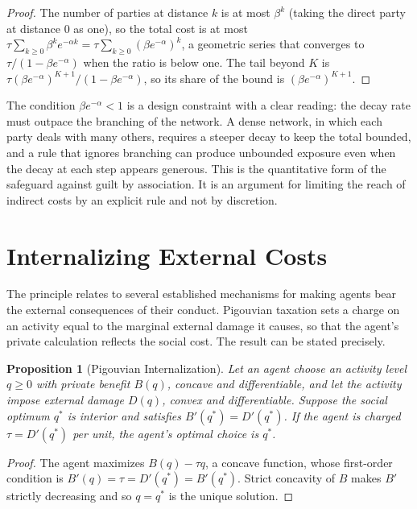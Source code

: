 \documentclass[11pt]{report}
\newtheorem{proposition}[theorem]{Proposition}
\theoremstyle{definition}
\theoremstyle{remark}
\begin{document}
\begin{proof}
The number of parties at distance $k$ is at most $\beta^k$ (taking the direct party at distance $0$ as one), so the total cost is at most $\tau\sum_{k\ge0}\beta^ke^{-\alpha k}=\tau\sum_{k\ge0}(\beta e^{-\alpha})^k$, a geometric series that converges to $\tau/(1-\beta e^{-\alpha})$ when the ratio is below one. The tail beyond $K$ is $\tau(\beta e^{-\alpha})^{K+1}/(1-\beta e^{-\alpha})$, so its share of the bound is $(\beta e^{-\alpha})^{K+1}$.
\end{proof}

The condition $\beta e^{-\alpha}<1$ is a design constraint with a clear reading: the decay rate must outpace the branching of the network. A dense network, in which each party deals with many others, requires a steeper decay to keep the total bounded, and a rule that ignores branching can produce unbounded exposure even when the decay at each step appears generous. This is the quantitative form of the safeguard against guilt by association. It is an argument for limiting the reach of indirect costs by an explicit rule and not by discretion.

\section{Internalizing External Costs}

The principle relates to several established mechanisms for making agents bear the external consequences of their conduct. Pigouvian taxation \cite{pigou} sets a charge on an activity equal to the marginal external damage it causes, so that the agent's private calculation reflects the social cost. The result can be stated precisely.

\begin{proposition}[Pigouvian Internalization]\label{prop:pigou}
Let an agent choose an activity level $q\ge0$ with private benefit $B(q)$, concave and differentiable, and let the activity impose external damage $D(q)$, convex and differentiable. Suppose the social optimum $q^\ast$ is interior and satisfies $B'(q^\ast)=D'(q^\ast)$. If the agent is charged $\tau=D'(q^\ast)$ per unit, the agent's optimal choice is $q^\ast$.
\end{proposition}

\begin{proof}
The agent maximizes $B(q)-\tau q$, a concave function, whose first-order condition is $B'(q)=\tau=D'(q^\ast)=B'(q^\ast)$. Strict concavity of $B$ makes $B'$ strictly decreasing and so $q=q^\ast$ is the unique solution.
\end{proof}
\end{document}
